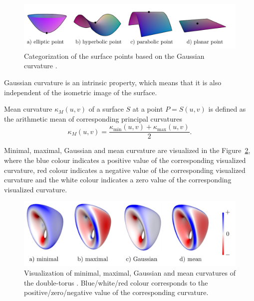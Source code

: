 \begin{figure}[h!]
    \centerline{\includegraphics[scale=0.5]{images/img33}}
    \caption[Categorization of the surface points based on the Gaussian curvature]
    {Categorization of the surface points based on the Gaussian curvature \cite{morris2003client}.}
    \label{img:33}
\end{figure}

Gaussian curvature is an
intrinsic property, which means that it is also independent of the isometric image of the surface.

\begin{definition}
    Mean curvature $\kappa_M(u, v)$ of a surface $S$ at a point $P=S(u,v)$ is defined as
    the arithmetic mean of corresponding principal curvatures
    $$\kappa_M(u, v) = \frac{\kappa_{\min}(u,v) + \kappa_{\max}(u,v)}{2}.$$
\end{definition}

Minimal, maximal, Gaussian and mean curvature are visualized in the Figure~\ref{img:16},
where the blue colour indicates a positive value of the corresponding visualized curvature,
red colour indicates a negative value of the corresponding visualized curvature
and the white colour indicates a zero value of the corresponding visualized curvature.

\begin{figure}[h!]
    \centerline{\includegraphics[scale=0.5]{images/img16}}
    \caption[Visualisation of the curvatures of the double-torus]
    {Visualization of minimal, maximal, Gaussian and mean curvatures of the double-torus \cite{novello2021differential}.
    Blue/white/red colour corresponds to the positive/zero/negative value of the corresponding curvature.}
    \label{img:16}
\end{figure}

